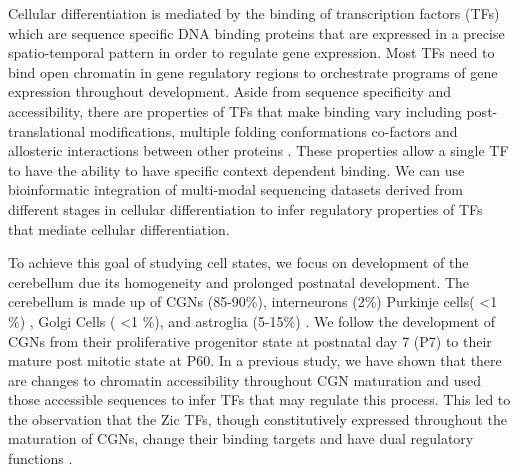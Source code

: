 \documentclass[fleqn,10pt]{wlscirep}
\begin{document}
Cellular differentiation is mediated by the binding of transcription factors (TFs) which are sequence specific DNA binding proteins that are expressed in a precise spatio-temporal pattern in order to regulate gene expression. Most TFs need to bind open chromatin in gene regulatory regions to orchestrate programs of gene expression throughout development. Aside from sequence specificity and accessibility, there are properties of TFs that make binding vary including  post-translational modifications, multiple folding conformations \cite{Siggers2014Protein-DNACodes, Slattery2014AbsenceGenome} co-factors and allosteric interactions between other proteins \cite{Siggers2014Protein-DNACodes}. These properties allow a single TF to have the ability to have specific context dependent binding.  We can use bioinformatic integration of multi-modal sequencing datasets derived from different stages in cellular differentiation to infer regulatory properties of TFs that mediate cellular differentiation. 

To achieve this goal of studying cell states, we focus on development of the cerebellum due its homogeneity and prolonged postnatal development. The cerebellum is made up of CGNs (85-90\%), interneurons (2\%) Purkinje cells( \textless 1 \%) , Golgi Cells ( \textless 1 \%), and astroglia (5-15\%) \cite{Frank2015RegulationCerebellum}. We follow the development of CGNs from their proliferative progenitor state at postnatal day 7 (P7) to their mature post mitotic state at P60. In a previous study, we have shown that there are changes to chromatin accessibility throughout CGN maturation and used those accessible sequences to infer TFs that may regulate this process. This led to the observation that the Zic TFs, though constitutively expressed throughout the maturation of CGNs, change their binding targets and have dual regulatory functions \cite{Frank2015RegulationCerebellum}.
\end{document}
